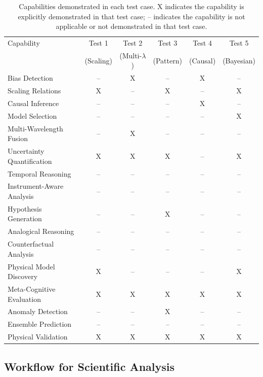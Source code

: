 \documentclass[usenatbib]{rasti}
\begin{document}
\begin{table}[htbp]
\centering
\begin{tabular}{lccccc}
\hline
Capability & Test 1 & Test 2 & Test 3 & Test 4 & Test 5 \\
& (Scaling) & (Multi-$\lambda$) & (Pattern) & (Causal) & (Bayesian) \\
\hline
Bias Detection & -- & X & -- & X & -- \\
Scaling Relations & X & -- & X & -- & X \\
Causal Inference & -- & -- & -- & X & -- \\
Model Selection & -- & -- & -- & -- & X \\
Multi-Wavelength Fusion & -- & X & -- & -- & -- \\
Uncertainty Quantification & X & X & X & -- & X \\
Temporal Reasoning & -- & -- & -- & -- & -- \\
Instrument-Aware Analysis & -- & -- & -- & -- & -- \\
Hypothesis Generation & -- & -- & X & -- & -- \\
Analogical Reasoning & -- & -- & -- & -- & -- \\
Counterfactual Analysis & -- & -- & -- & -- & -- \\
Physical Model Discovery & X & -- & -- & -- & X \\
Meta-Cognitive Evaluation & X & X & X & X & X \\
Anomaly Detection & -- & -- & X & -- & -- \\
Ensemble Prediction & -- & -- & -- & -- & -- \\
Physical Validation & X & X & X & X & X \\
\hline
\end{tabular}
\caption{Capabilities demonstrated in each test case. X indicates the capability is explicitly demonstrated in that test case; -- indicates the capability is not applicable or not demonstrated in that test case.}
\label{tab:capabilities}
\end{table}

\subsection{Workflow for Scientific Analysis}
\end{document}
